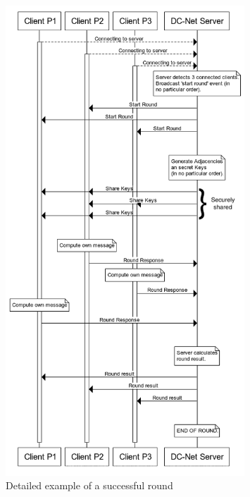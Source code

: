 \begin{figure}[H]
    \centering
    \includegraphics[width=0.8\textwidth]{Images/Design/successfulRound.png}
    \caption{Detailed example of a successful round}
    \label{fig:successfulRound}
\end{figure}

